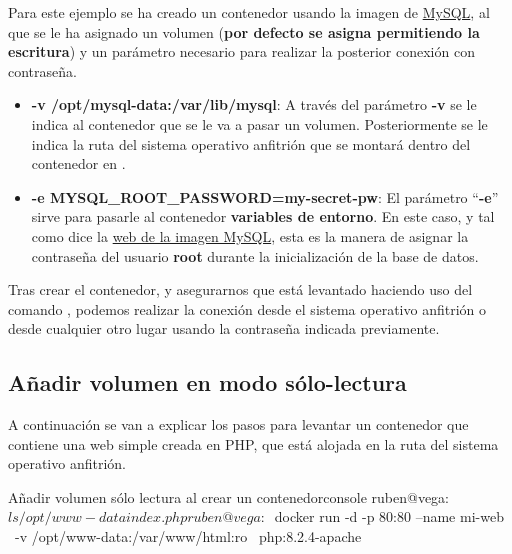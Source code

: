 Para este ejemplo se ha creado un contenedor usando la imagen de \href{https://hub.docker.com/_/mysql}{MySQL}, al que se le ha asignado un volumen (\textbf{por defecto se asigna permitiendo la escritura}) y un parámetro necesario para realizar la posterior conexión con contraseña.

\begin{itemize}
    \item \textbf{-v /opt/mysql-data:/var/lib/mysql}: A través del parámetro \textbf{-v} se le indica al contenedor que se le va a pasar un volumen. Posteriormente se le indica la ruta del sistema operativo anfitrión  que se montará dentro del contenedor en .
    \item \textbf{-e MYSQL\_ROOT\_PASSWORD=my-secret-pw}: El parámetro “\textbf{-e}” sirve para pasarle al contenedor \textbf{variables de entorno}. En este caso, y tal como dice la \href{https://hub.docker.com/_/mysql}{web de la imagen MySQL}, esta es la manera de asignar la contraseña del usuario \textbf{root} durante la inicialización de la base de datos.
\end{itemize}

Tras crear el contenedor, y asegurarnos que está levantado haciendo uso del comando , podemos realizar la conexión desde el sistema operativo anfitrión o desde cualquier otro lugar usando la contraseña indicada previamente.


\subsection{Añadir volumen en modo sólo-lectura}
A continuación se van a explicar los pasos para levantar un contenedor que contiene una web simple creada en PHP, que está alojada en la ruta  del sistema operativo anfitrión.


\begin{mycode}{Añadir volumen sólo lectura al crear un contenedor}{console}{}
ruben@vega:~$ ls /opt/www-data
index.php
ruben@vega:~$ docker run -d -p 80:80 --name mi-web \
    -v /opt/www-data:/var/www/html:ro \
    php:8.2.4-apache
\end{mycode}

